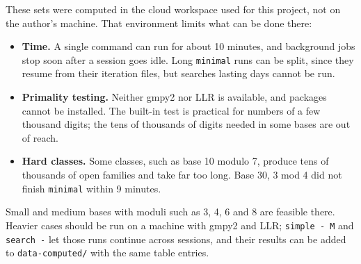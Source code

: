 \documentclass[11pt]{article}
\newcommand{\code}[1]{\texttt{#1}}
\begin{document}
These sets were computed in the cloud workspace used for this project, not on the author's machine. That environment limits what can be done there:
\begin{itemize}
\item \textbf{Time.} A single command can run for about 10 minutes, and background jobs stop soon after a session goes idle. Long \code{minimal} runs can be split, since they resume from their iteration files, but searches lasting days cannot be run.
\item \textbf{Primality testing.} Neither gmpy2 nor LLR is available, and packages cannot be installed. The built-in test is practical for numbers of a few thousand digits; the tens of thousands of digits needed in some bases are out of reach.
\item \textbf{Hard classes.} Some classes, such as base 10 modulo 7, produce tens of thousands of open families and take far too long. Base 30, 3 mod 4 did not finish \code{minimal} within 9 minutes.
\end{itemize}
Small and medium bases with moduli such as 3, 4, 6 and 8 are feasible there. Heavier cases should be run on a machine with gmpy2 and LLR; \code{simple - M} and \code{search -} let those runs continue across sessions, and their results can be added to \code{data-computed/} with the same table entries.
\end{document}
